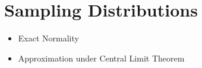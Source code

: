 \documentclass{report}
\begin{document}
\section{Sampling Distributions}
\begin{itemize}
	\item Exact Normality
	\item Approximation under Central Limit Theorem
\end{itemize}




	

\end{document}
